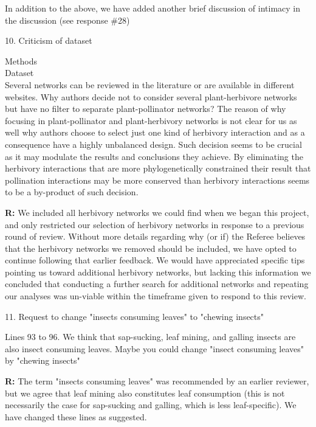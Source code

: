 \documentclass[12pt]{letter}
\newenvironment{refquote}{\bigskip \begin{it}}{\end{it}\smallskip}
\begin{document}
		In addition to the above, we have added another brief discussion of intimacy in the discussion (see response \#28)


	10. Criticism of dataset %


		\begin{refquote}
		Methods\\
		Dataset\\
		Several networks can be reviewed in the literature or are available in different websites. Why authors decide not to consider several plant-herbivore networks but have no filter to separate plant-pollinator networks? The reason of why focusing in plant-pollinator and plant-herbivory networks is not clear for us as well why authors choose to select just one kind of herbivory interaction and as a consequence have a highly unbalanced design. Such decision seems to be crucial as it may modulate the results and conclusions they achieve. By eliminating the herbivory interactions that are more phylogenetically constrained their result that pollination interactions may be more conserved than herbivory interactions seems to be a by-product of such decision.
		\end{refquote}


		\textbf{R:} We included all herbivory networks we could find when we began this project, and only restricted our selection of herbivory networks in response to a previous round of review. Without more details regarding why (or if) the Referee believes that the herbivory networks we removed should be included, we have opted to continue following that earlier feedback. We would have appreciated specific tips pointing us toward additional herbivory networks, but lacking this information we concluded that  conducting a further search for additional networks and repeating our analyses was un-viable within the timeframe given to respond to this review.


	11. Request to change "insects consuming leaves" to "chewing insects"

		\begin{refquote}
			Lines 93 to 96. We think that sap-sucking, leaf mining, and galling insects are also insect consuming leaves. Maybe you could change "insect consuming leaves" by "chewing insects"
		\end{refquote}

		\textbf{R:} The term "insects consuming leaves" was recommended by an earlier reviewer, but we agree that leaf mining also constitutes leaf consumption (this is not necessarily the case for sap-sucking and galling, which is less leaf-specific). We have changed these lines as suggested.
\end{document}

